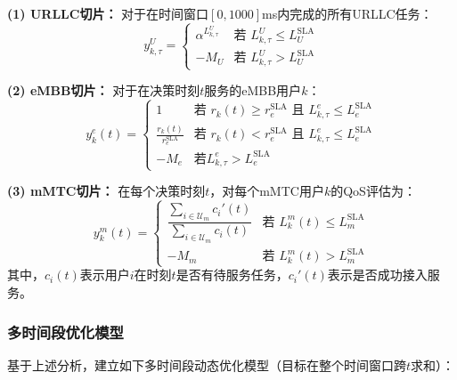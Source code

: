 \textbf{(1) URLLC切片：}
对于在时间窗口$[0, 1000]$ms内完成的所有URLLC任务：
\begin{equation}
y_{k,\tau}^{U} = \begin{cases}
\alpha^{L_{k,\tau}^{U}} & \text{若 } L_{k,\tau}^{U} \leq L_{U}^{\text{SLA}} \\
-M_{U} & \text{若 } L_{k,\tau}^{U} > L_{U}^{\text{SLA}}
\end{cases}
\end{equation}

\textbf{(2) eMBB切片：}
对于在决策时刻$t$服务的eMBB用户$k$：
\begin{equation}
y_{k}^{e}(t) = \begin{cases}
1 & \text{若 } r_k(t) \geq r_{e}^{\text{SLA}} \text{ 且 } L_{k,\tau}^{e} \leq L_{e}^{\text{SLA}} \\
\frac{r_k(t)}{r_{e}^{\text{SLA}}} & \text{若 } r_k(t) < r_{e}^{\text{SLA}} \text{ 且 } L_{k,\tau}^{e} \leq L_{e}^{\text{SLA}} \\
-M_{e} & \text{若} L_{k,\tau}^{e} > L_{e}^{\text{SLA}}
\end{cases}
\end{equation}

\textbf{(3) mMTC切片：}
在每个决策时刻$t$，对每个mMTC用户$k$的QoS评估为：
\begin{equation}
y_k^{m}(t) = \begin{cases}
\dfrac{\sum_{i \in \mathcal{U}_{m}} c_i'(t)}{\sum_{i \in \mathcal{U}_{m}} c_i(t)} & \text{若 } L_k^{m}(t) \le L_{m}^{\text{SLA}} \\
-M_{m} & \text{若 } L_k^{m}(t) > L_{m}^{\text{SLA}}
\end{cases}
\end{equation}
其中，$c_i(t)$表示用户$i$在时刻$t$是否有待服务任务，$c_i'(t)$表示是否成功接入服务。

\subsubsection{多时间段优化模型}
 
基于上述分析，建立如下多时间段动态优化模型（目标在整个时间窗口跨$t$求和）：

